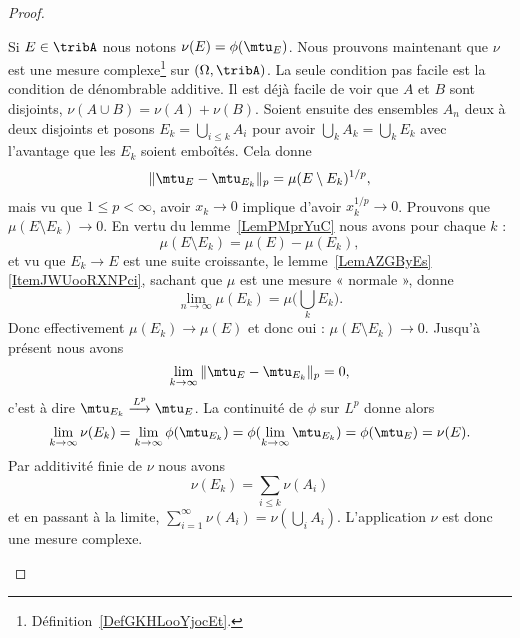 \begin{proof}
\begin{subproof}
            Si \( E\in\tribA\) nous notons \( \nu(E)=\phi(\mtu_E)\). Nous prouvons maintenant que \( \nu\) est une mesure complexe\footnote{Définition~\ref{DefGKHLooYjocEt}.} sur \( (\Omega,\tribA)\). La seule condition pas facile est la condition de dénombrable additive. Il est déjà facile de voir que \( A\) et \( B\) sont disjoints, \( \nu(A\cup B)=\nu(A)+\nu(B)\). Soient ensuite des ensembles \( A_n\) deux à deux disjoints et posons \( E_k=\bigcup_{i\leq k}A_i\) pour avoir \( \bigcup_kA_k=\bigcup_kE_k\) avec l'avantage que les \( E_k\) soient emboîtés. Cela donne
            \begin{equation}
                \| \mtu_E-\mtu_{E_k} \|_p=\mu(E\setminus E_k)^{1/p},
            \end{equation}
            mais vu que \( 1\leq p<\infty\), avoir \( x_k\to 0\) implique d'avoir \( x_k^{1/p}\to 0\). Prouvons que \( \mu(E\setminus E_k)\to 0\). En vertu du lemme~\ref{LemPMprYuC} nous avons pour chaque \( k\) :
            \begin{equation}
                \mu(E\setminus E_k)=\mu(E)-\mu(E_k),
            \end{equation}
            et vu que \( E_k\to E\) est une suite croissante, le lemme~\ref{LemAZGByEs}\ref{ItemJWUooRXNPci}, sachant que \( \mu\) est une mesure « normale », donne
            \begin{equation}
                \lim_{n\to \infty} \mu(E_k)=\mu\big( \bigcup_kE_k \big).
            \end{equation}
            Donc effectivement \( \mu(E_k)\to \mu(E)\) et donc oui : \( \mu(E\setminus E_k)\to 0\). Jusqu'à présent nous avons
            \begin{equation}
                \lim_{k\to \infty} \| \mtu_E-\mtu_{E_k} \|_p=0,
            \end{equation}
            c'est à dire \( \mtu_{E_k}\stackrel{L^p}{\longrightarrow}\mtu_E\). La continuité de \( \phi\) sur \( L^p\) donne alors
            \begin{equation}
                \lim_{k\to \infty} \nu(E_k)=\lim_{k\to \infty} \phi(\mtu_{E_k})=\phi(\lim_{k\to \infty} \mtu_{E_k})=\phi(\mtu_E)=\nu(E).
            \end{equation}
            Par additivité finie de \( \nu\) nous avons
            \begin{equation}
                \nu(E_k)=\sum_{i\leq k}\nu(A_i)
            \end{equation}
            et en passant à la limite, \( \sum_{i=1}^{\infty}\nu(A_i)=\nu(\bigcup_{i}A_i)\). L'application \( \nu\) est donc une mesure complexe.


\end{subproof}
\end{proof}
